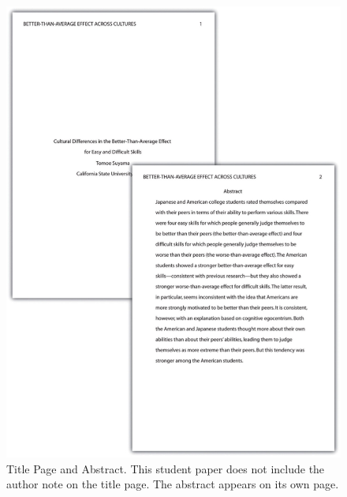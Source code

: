 \begin{figure}
\includegraphics[width=\linewidth]{figures/112}
\caption{Title Page and Abstract. This student paper does not include the author note on the title page. The abstract appears on its own page.}
\label{fig:p1}
\end{figure}

